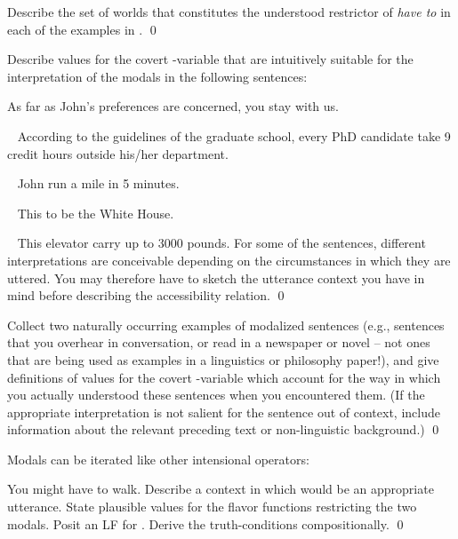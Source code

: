 \begin{exercise}
  Describe the set of worlds that constitutes the understood restrictor of
  \emph{have to} in each of the examples in . \qed
\end{exercise}

\begin{exercise}
	
	Describe values for the covert -variable that are
  intuitively suitable for the interpretation of the modals in the
  following sentences:
	
	\ex As far as John's preferences are concerned, you
   stay with us. \xe
	
	\ex~ According to the guidelines of the graduate school, every PhD
  candidate  take 9 credit hours outside his/her
  department. \xe
	
	\ex~ John  run a mile in 5 minutes. \xe
	
	\ex~ This  to be the White House. \xe
	
	\ex~ This elevator  carry up to 3000 pounds. \xe
	For some of the sentences, different interpretations are conceivable
  depending on the circumstances in which they are uttered. You may
  therefore have to sketch the utterance context you have in mind
  before describing the accessibility relation. \qed
\end{exercise}
\begin{exercise}
	
	Collect two naturally occurring examples of modalized sentences
  (e.g., sentences that you overhear in conversation, or read in a
  newspaper or novel -- not ones that are being used as examples in a
  linguistics or philosophy paper!), and give definitions of values
  for the covert -variable which account for the way in
  which you actually understood these sentences when you encountered
  them. (If the appropriate interpretation is not salient for the
  sentence out of context, include information about the relevant
  preceding text or non-linguistic background.) \qed
\end{exercise}

\begin{exercise}
  Modals can be iterated like other intensional operators:

  \ex You might have to walk. \xe
  Describe a context in which \Last would be an appropriate utterance. State
  plausible values for the  flavor functions restricting the two
  modals. Posit an LF for \Last. Derive the truth-conditions compositionally.
  \qed
  
\end{exercise}

